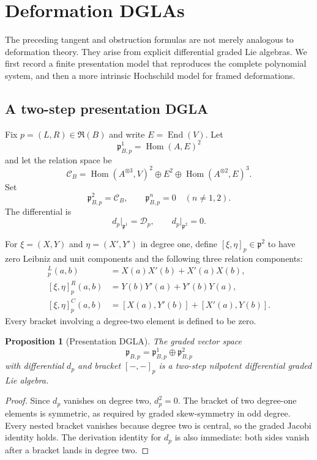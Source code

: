 \documentclass[11pt]{amsart}
\newtheorem{proposition}[theorem]{Proposition}
\newcommand{\End}{\operatorname{End}}
\newcommand{\Hom}{\operatorname{Hom}}
\newcommand{\Rfib}{\mathfrak R}
\newcommand{\cD}{\mathscr D}
\newcommand{\gpres}{\mathfrak p}
\newcommand{\Rel}{\mathscr C}
\begin{document}
\section{Deformation DGLAs}\label{sec:dgla}

The preceding tangent and obstruction formulas are not merely analogous to deformation theory.  They arise from explicit differential graded Lie algebras.  We first record a finite presentation model that reproduces the complete polynomial system, and then a more intrinsic Hochschild model for framed deformations.

\subsection{A two-step presentation DGLA}

Fix $p=(L,R)\in\Rfib(B)$ and write $E=\End(V)$.  Let
\[
\gpres_{B,p}^{1}=\Hom(A,E)^2
\]
and let the relation space be
\[
\Rel_B=
\Hom(A^{\otimes3},V)^2
\oplus E^2
\oplus\Hom(A^{\otimes2},E)^3.
\]
Set
\[
\gpres_{B,p}^{2}=\Rel_B,
\qquad
\gpres_{B,p}^{n}=0\quad(n\neq1,2).
\]
The differential is
\[
d_p\big|_{\gpres^1}=\cD_p,
\qquad
d_p\big|_{\gpres^2}=0.
\]

For $\xi=(X,Y)$ and $\eta=(X',Y')$ in degree one, define $[\xi,\eta]_p\in\gpres^2$ to have zero Leibniz and unit components and the following three relation components:
\begin{align}
[\xi,\eta]^L_p(a,b)
&=X(a)X'(b)+X'(a)X(b),\\
[\xi,\eta]^R_p(a,b)
&=Y(b)Y'(a)+Y'(b)Y(a),\\
[\xi,\eta]^C_p(a,b)
&=[X(a),Y'(b)]+[X'(a),Y(b)].
\end{align}
Every bracket involving a degree-two element is defined to be zero.

\begin{proposition}[Presentation DGLA]\label{prop:presentation-dgla}
The graded vector space
\[
\gpres_{B,p}=\gpres_{B,p}^{1}\oplus\gpres_{B,p}^{2}
\]
with differential $d_p$ and bracket $[-,-]_p$ is a two-step nilpotent differential graded Lie algebra.
\end{proposition}

\begin{proof}
Since $d_p$ vanishes on degree two, $d_p^2=0$.  The bracket of two degree-one elements is symmetric, as required by graded skew-symmetry in odd degree.  Every nested bracket vanishes because degree two is central, so the graded Jacobi identity holds.  The derivation identity for $d_p$ is also immediate: both sides vanish after a bracket lands in degree two.
\end{proof}
\end{document}
